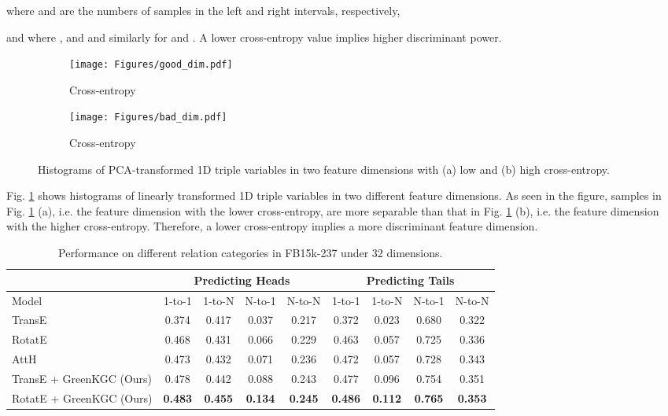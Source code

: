 \documentclass{article}
\begin{document}
where  and  are the numbers of samples in the left and right intervals,
respectively,

and where , and 
 and similarly for  and . A
lower cross-entropy value implies higher discriminant power. 

\begin{figure}[t]
\centering
     \begin{subfigure}[b]{0.48\textwidth}
         \centering
         \texttt{[image: Figures/good\_dim.pdf]}
         \caption{Cross-entropy }
     \end{subfigure}
\begin{subfigure}[b]{0.48\textwidth}
         \centering
         \texttt{[image: Figures/bad\_dim.pdf]}
         \caption{Cross-entropy }
     \end{subfigure}
\caption{Histograms of PCA-transformed 1D triple variables in two feature dimensions with (a) low and (b) high cross-entropy.}\label{fig:dim_hist}
\end{figure}



Fig. \ref{fig:dim_hist} shows histograms of linearly transformed 1D triple 
variables in two different feature dimensions. As seen in the figure, samples in
Fig. \ref{fig:dim_hist} (a), i.e. the feature dimension with the lower 
cross-entropy, are more separable than that in Fig. \ref{fig:dim_hist} (b), i.e.
the feature dimension with the higher cross-entropy. Therefore, a lower 
cross-entropy implies a more discriminant feature dimension.








\begin{table*}[!t]
\color{black}
\setlength\tabcolsep{3pt}
\centering
\begin{tabular}{l | c  c  c  c | c  c  c  c }
\hline
& \multicolumn{4}{c|}{\textbf{Predicting Heads}} & \multicolumn{4}{c}{\textbf{Predicting Tails}} \\
\hline
Model & 1-to-1 & 1-to-N & N-to-1 & N-to-N & 1-to-1 & 1-to-N & N-to-1 & N-to-N \\
\hline
TransE \cite{bordes2013translating}  &0.374 &0.417 &0.037 &0.217 &0.372 &0.023 &0.680 &0.322\\
RotatE \cite{sun2018rotate}          &0.468 &0.431 &0.066 &0.229 &0.463 &0.057 &0.725 &0.336\\
AttH \cite{chami2020low}             &0.473 &0.432 &0.071 &0.236 &0.472 &0.057 &0.728 &0.343\\ 
\hline
TransE + GreenKGC (Ours)     &0.478 &0.442 &0.088 &0.243 &0.477 &0.096 &0.754 &0.351\\
RotatE + GreenKGC (Ours)     &\textbf{0.483} &\textbf{0.455} &\textbf{0.134} &\textbf{0.245} &\textbf{0.486} &\textbf{0.112} &\textbf{0.765} &\textbf{0.353}\\
\hline
\end{tabular}
\caption{Performance on different relation categories in FB15k-237 under 32 dimensions.}
\label{tab:rel}
\end{table*}
\end{document}
